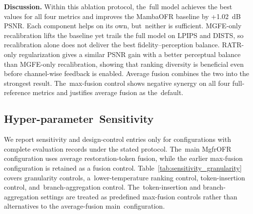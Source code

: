 \documentclass[symmetry,article,accept,pdftex,moreauthors]{Definitions/mdpi}
\begin{document}
\textbf{Discussion.} Within this ablation protocol, the~full model achieves the best values for all four metrics and improves the MambaOFR baseline by +1.02~dB PSNR. Each component helps on its own, but~neither is sufficient. MGFE-only recalibration lifts the baseline yet trails the full model on LPIPS and DISTS, so recalibration alone does not deliver the best fidelity--perception balance. RATR-only regularization gives a similar PSNR gain with a better perceptual balance than MGFE-only recalibration, showing that ranking diversity is beneficial even before channel-wise feedback is enabled. Average fusion combines the two into the strongest result. The~max-fusion control shows negative synergy on all four full-reference metrics and justifies average fusion as the~default.



\subsection{Hyper-parameter~Sensitivity}
\label{subsec:sensitivity}

We report sensitivity and design-control entries only for configurations with complete evaluation records under the stated protocol. The~main MgfrOFR configuration uses average restoration-token fusion, while the earlier max-fusion configuration is retained as a fusion control. Table~\ref{tab:sensitivity_granularity} covers granularity controls, a~lower-temperature ranking control, token-insertion control, and~branch-aggregation control. The~token-insertion and branch-aggregation settings are treated as predefined max-fusion controls rather than alternatives to the average-fusion main~configuration.
\end{document}
